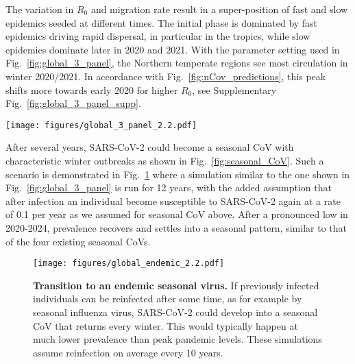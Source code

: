 \documentclass[rmp, reprint, superscriptaddress, floatfix,amsmath]{revtex4-1}
\newcommand{\forcing}{\varepsilon}
\begin{document}
The variation in $R_0$ and migration rate result in a super-position of fast and slow epidemics seeded at different times.
The initial phase is dominated by fast epidemics driving rapid dispersal, in particular in the tropics, while slow epidemics dominate later in 2020 and 2021.
With the parameter setting used in Fig.~\ref{fig:global_3_panel}, the Northern temperate regions see most circulation in winter 2020/2021. 
In accordance with Fig.~\ref{fig:nCov_predictions}, this peak shifts more towards early 2020 for higher $R_0$, see Supplementary Fig.~\ref{fig:global_3_panel_supp}.

\begin{figure*}[tb]
    \centering
    \texttt{[image: figures/global\_3\_panel\_2.2.pdf]}
    \caption{{\bf Extended circulation through overlapping epidemics in variable subpopulations.} These simulations of a pandemic scenario assume 1,000 sub-populations with an average $\langle R_0\rangle$ of 2.2 and standard deviation $0.5$, 40\% of which have weak seasonal forcing $\forcing \in [0,0.2]$ (tropical) and the remainder have strong variation with $\forcing \in [0.25,0.75]$. The super-position of many variable epidemics can result in a global prevalence that decays only slowly through 2020 and 2021. 
    Lighter lines have lower $R_0$, darker lines have higher $R_0$. 
    The actual observed case counts reported for Hubei are added (brown line) and multiplied by three to account for possible under-reporting of mild cases. A subset of 30 randomly chosen simulations are plotted for each region.
    Analogous figures for different $R_0$ parameter values are shown in Supplementary Fig.~\ref{fig:global_3_panel_supp}.}
    \label{fig:global_3_panel}
\end{figure*}

After several years, SARS-CoV-2 could become a seasonal CoV with characteristic winter outbreaks as shown in Fig.~\ref{fig:seasonal_CoV}.
Such a scenario is demonstrated in Fig.~\ref{fig:endemic} where a simulation similar to the one shown in Fig.~\ref{fig:global_3_panel} is run for 12 years, with the added assumption that after infection an individual become susceptible to SARS-CoV-2 again at a rate of 0.1 per year as we assumed for seasonal CoV above. 
After a pronounced low in 2020-2024, prevalence recovers and settles into a seasonal pattern, similar to that of the four existing seasonal CoVs. 

\begin{figure}
    \centering
    \texttt{[image: figures/global\_endemic\_2.2.pdf]}
    \caption{{\bf Transition to an endemic seasonal virus.} 
    If previously infected individuals can be reinfected after some time, as for example by seasonal influenza virus, SARS-CoV-2 could develop into a seasonal CoV that returns every winter. This would typically happen at much lower prevalence than peak pandemic levels. 
    These simulations assume reinfection on average every 10 years.}
    \label{fig:endemic}
\end{figure}
\end{document}
